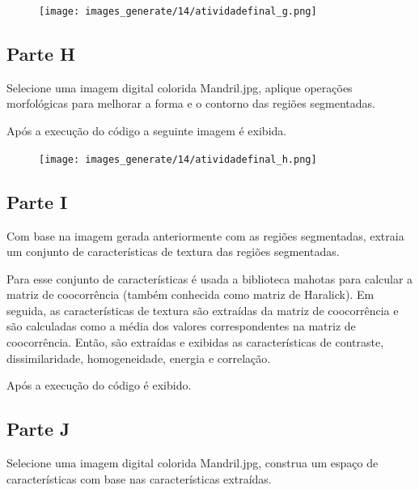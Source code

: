 \documentclass[10pt,a4paper]{article}
\begin{document}
\begin{figure}[H]
    \centering
    {{\texttt{[image: images\_generate/14/atividadefinal\_g.png]}}}
\end{figure}


\subsection{Parte H}

Selecione uma imagem digital colorida Mandril.jpg, aplique operações morfológicas para melhorar a forma e o contorno das regiões segmentadas. 



Após a execução do código a seguinte imagem é exibida.

\begin{figure}[H]
    \centering
    {{\texttt{[image: images\_generate/14/atividadefinal\_h.png]}}}
\end{figure}



\subsection{Parte I}

Com base na imagem gerada anteriormente com as regiões segmentadas, extraia um conjunto de características de textura das regiões segmentadas. 

Para esse conjunto de características é usada a biblioteca mahotas para calcular a matriz de coocorrência (também conhecida como matriz de Haralick). Em seguida, as características de textura são extraídas da matriz de coocorrência e são calculadas como a média dos valores correspondentes na matriz de coocorrência. Então, são extraídas e exibidas as características de contraste, dissimilaridade, homogeneidade, energia e correlação.



Após a execução do código é exibido.





\subsection{Parte J}

Selecione uma imagem digital colorida Mandril.jpg, construa um espaço de características com base nas características extraídas. 
\end{document}
